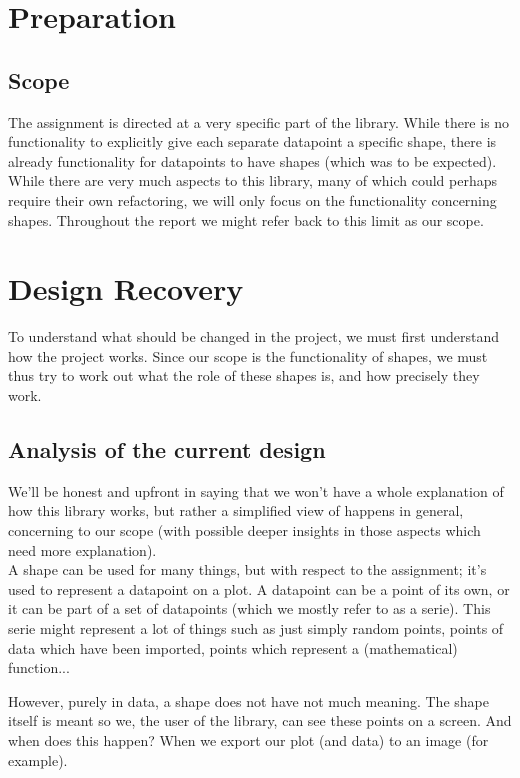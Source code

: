 \documentclass{article}
\begin{document}
\section{Preparation}

\subsection{Scope}

The assignment is directed at a very specific part of the library. While there is no functionality to explicitly give each separate datapoint a specific shape, there is already functionality for datapoints to have shapes (which was to be expected). While there are very much aspects to this library, many of which could perhaps require their own refactoring, we will only focus on the functionality concerning shapes. Throughout the report we might refer back to this limit as our scope.

\section{Design Recovery}

To understand what should be changed in the project, we must first understand how the project works. Since our scope is the functionality of shapes, we must thus try to work out what the role of these shapes is, and how precisely they work.

\subsection{Analysis of the current design}

We'll be honest and upfront in saying that we won't have a whole explanation of how this library works, but rather a simplified view of happens in general, concerning to our scope (with possible deeper insights in those aspects which need more explanation).\\

A shape can be used for many things, but with respect to the assignment; it's used to represent a datapoint on a plot. A datapoint can be a point of its own, or it can be part of a set of datapoints (which we mostly refer to as a serie). This serie might represent a lot of things such as just simply random points, points of data which have been imported, points which represent a (mathematical) function... 

However, purely in data, a shape does not have not much meaning. The shape itself is meant so we, the user of the library, can see these points on a screen. And when does this happen? When we export our plot (and data) to an image (for example).\\
\end{document}
